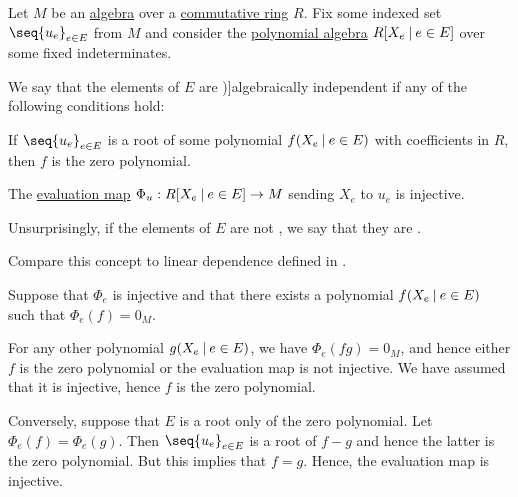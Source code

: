 \begin{definition}\label{def:algebraic_dependence}\mimprovised
  Let \( M \) be an \hyperref[def:algebra_over_ring]{algebra} over a \hyperref[def:ring/commutative]{commutative ring} \( R \). Fix some indexed set \( \seq{ u_e }_{e \in E} \) from \( M \) and consider the \hyperref[def:polynomial_algebra]{polynomial algebra} \( R[X_e \given e \in E] \) over some fixed indeterminates.

  We say that the elements of \( E \) are \term[ru=алгебрически независимые (елементы) (\cite[408]{Винберг2014Алгебра})]{algebraically independent} if any of the following conditions hold:

  \begin{thmenum}
     If \( \seq{ u_e }_{e \in E} \) is a root of some polynomial \( f(X_e \given e \in E) \) with coefficients in \( R \), then \( f \) is the zero polynomial.

     The \hyperref[thm:polynomial_algebra_universal_property]{evaluation map} \( \Phi_u: R[X_e \given e \in E] \to M \) sending \( X_e \) to \( u_e \) is injective.
  \end{thmenum}
\end{definition}
\begin{comments}
  \item Unsurprisingly, if the elements of \( E \) are not , we say that they are .
  \item Compare this concept to linear dependence defined in .
\end{comments}
\begin{defproof}
   Suppose that \( \Phi_e \) is injective and that there exists a polynomial \( f(X_e \given e \in E) \) such that \( \Phi_e(f) = 0_M \).

  For any other polynomial \( g(X_e \given e \in E) \), we have \( \Phi_e(f g) = 0_M \), and hence either \( f \) is the zero polynomial or the evaluation map is not injective. We have assumed that it is injective, hence \( f \) is the zero polynomial.

   Conversely, suppose that \( E \) is a root only of the zero polynomial. Let \( \Phi_e(f) = \Phi_e(g) \). Then \( \seq{ u_e }_{e \in E} \) is a root of \( f - g \) and hence the latter is the zero polynomial. But this implies that \( f = g \). Hence, the evaluation map is injective.
\end{defproof}

